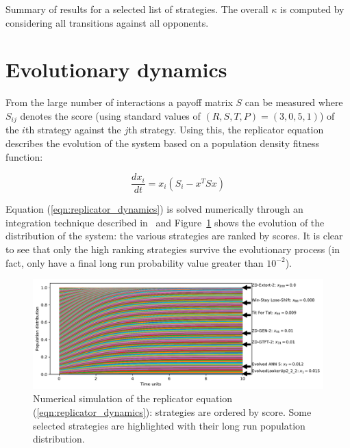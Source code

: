 \documentclass[a4paper]{article}
\begin{document}
\begin{table}[!hbtp]
    \begin{center}
    \tiny
    
    \end{center}
    \caption{Summary of results for a selected list of strategies. The overall
             \(\kappa\) is computed by considering all transitions against all
             opponents.}
    \label{tbl:overall_summary_results}
\end{table}

\section{Evolutionary dynamics}\label{sec:evolutionary-dynamics}

From the large number of interactions a payoff matrix \(S\)
can be measured where \(S_{ij}\) denotes the score (using standard values of
\((R, S, T, P) = (3, 0, 5, 1)\)) of the \(i\)th strategy against the \(j\)th
strategy. Using this, the replicator equation describes the evolution of the
system based on a population density fitness function:

\begin{equation}\label{eqn:replicator_dynamics}
    \frac{dx_i}{dt} = x_i(S_i-x^TS x)
\end{equation}

Equation (\ref{eqn:replicator_dynamics}) is solved numerically through an
integration technique described in~\cite{Petzold1983} and
Figure~\ref{fig:replicator_dynamics} shows the evolution of the distribution of
the system: the various strategies are ranked by scores. It is clear to see that
only the high ranking strategies survive the evolutionary process (in fact,
only 
have a final long run probability value greater than \(10 ^ {-2}\)).

\begin{figure}[!htbp]
    \centering
    \includegraphics[width=.8\textwidth]{./assets/img/replicator_dynamics/main.pdf}
    \caption{Numerical simulation of the replicator equation
    (\ref{eqn:replicator_dynamics}): strategies are ordered by score. Some
    selected strategies are highlighted with their long run population
    distribution.}
    \label{fig:replicator_dynamics}
\end{figure}
\end{document}
